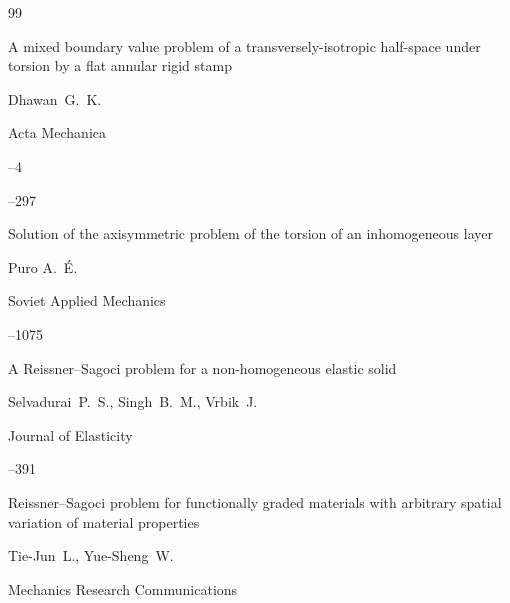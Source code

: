 \begin{thebibliography}{99}




\paper A mixed boundary value problem of a transversely-isotropic half-space under torsion by a flat annular rigid stamp

\by Dhawan~G.~K. 

\jour Acta Mechanica 



--4 

--297





\paper Solution of the axisymmetric problem of the torsion of an inhomogeneous layer 

\by Puro A.~\'E.

\jour Soviet Applied Mechanics 




--1075





\paper A Reissner--Sagoci problem for a non-homogeneous elastic solid 

\by Selvadurai~P.~S., Singh~B.~M., Vrbik~J. 

\jour Journal of Elasticity 




--391





\paper Reissner--Sagoci problem for functionally graded materials with arbitrary spatial variation of material properties 

\by Tie-Jun~L., Yue-Sheng~W. 

\jour Mechanics Research Communications 




\end{thebibliography}

